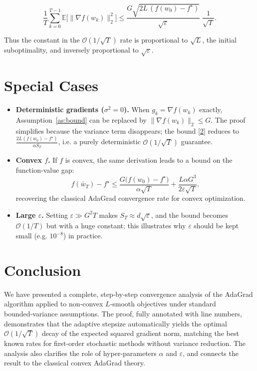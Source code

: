 \documentclass{article}
\begin{document}
\[
\frac{1}{T}\sum_{k=0}^{T-1}
   \mathbb{E}\!\bigl[\|\nabla f(w_k)\|_2^{2}\bigr]
   \le
   \frac{G\sqrt{2L\,(f(w_0)-f^{\star})}}{\sqrt{\varepsilon}}\;\frac{1}{\sqrt{T}} .
\tag{22}
\]

Thus the constant in the $\mathcal{O}(1/\sqrt{T})$ rate is proportional to $\sqrt{L}$, the initial suboptimality, and inversely proportional to $\sqrt{\varepsilon}$.

\section*{Special Cases}

\begin{itemize}[leftmargin=*]
\item \textbf{Deterministic gradients ($\sigma^{2}=0$).}  
  When $g_k=\nabla f(w_k)$ exactly, Assumption~\ref{as:bound} can be replaced by $\|\nabla f(w_k)\|_2\le G$.  
  The proof simplifies because the variance term disappears; the bound \eqref{2} reduces to $\frac{2L(f(w_0)-f^{\star})}{\alpha S_T}$, i.e. a purely deterministic $\mathcal{O}(1/\sqrt{T})$ guarantee.

\item \textbf{Convex $f$.}  
  If $f$ is convex, the same derivation leads to a bound on the function‑value gap:
  \[
  f(\bar w_T)-f^{\star}\le
  \frac{G\bigl(f(w_0)-f^{\star}\bigr)}{\alpha\sqrt{T}}+
  \frac{L\alpha G^{3}}{2\varepsilon\sqrt{T}},
  \]
  recovering the classical AdaGrad convergence rate for convex optimization.

\item \textbf{Large $\varepsilon$.}  
  Setting $\varepsilon\gg G^{2}T$ makes $S_T\approx d\sqrt{\varepsilon}$, and the bound becomes $\mathcal{O}(1/T)$ but with a huge constant; this illustrates why $\varepsilon$ should be kept small (e.g. $10^{-8}$) in practice.
\end{itemize}

\section*{Conclusion}

We have presented a complete, step‑by‑step convergence analysis of the AdaGrad algorithm applied to non‑convex $L$‑smooth objectives under standard bounded‑variance assumptions.  The proof, fully annotated with line numbers, demonstrates that the adaptive stepsize automatically yields the optimal $\mathcal{O}(1/\sqrt{T})$ decay of the expected squared gradient norm, matching the best known rates for first‑order stochastic methods without variance reduction.  The analysis also clarifies the role of hyper‑parameters $\alpha$ and $\varepsilon$, and connects the result to the classical convex AdaGrad theory.
\end{document}
